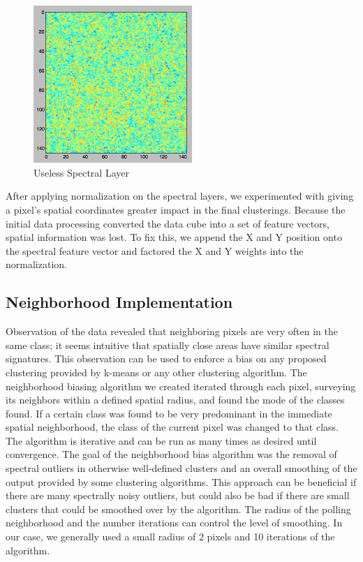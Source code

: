 \documentclass[journal]{IEEEtran}
\begin{document}
    \begin{figure}[h!]
      \centering\includegraphics[width=6cm]{images/horribleSpec.png}
      \caption{Useless Spectral Layer}
      \label{fig:BadLayer}
    \end{figure}

    After applying normalization on the spectral layers, we experimented with giving a pixel’s spatial coordinates greater impact in the final clusterings. Because the initial data processing converted the data cube into a set of feature vectors, spatial information was lost. To fix this, we append the X and Y position onto the spectral feature vector and factored the X and Y weights into the normalization.\\

  \subsection{Neighborhood Implementation}
    Observation of the data revealed that neighboring pixels are very often in the same class; it seems intuitive that spatially close areas have similar spectral signatures.  This observation can be used to enforce a bias on any proposed clustering provided by k-means or any other clustering algorithm. The neighborhood biasing algorithm we created iterated through each pixel, surveying its neighbors within a defined spatial radius, and found the mode of the classes found. If a certain class was found to be very predominant in the immediate spatial neighborhood, the class of the current pixel was changed to that class. The algorithm is iterative and can be run as many times as desired until convergence. The goal of the neighborhood bias algorithm was the removal of spectral outliers in otherwise well-defined clusters and an overall smoothing of the output provided by some clustering algorithms. This approach can be beneficial if there are many spectrally noisy outliers, but could also be bad if there are small clusters that could be smoothed over by the algorithm. The radius of the polling neighborhood and the number iterations can control the level of smoothing. In our case, we generally used a small radius of 2 pixels and 10 iterations of the algorithm.\\
\end{document}
